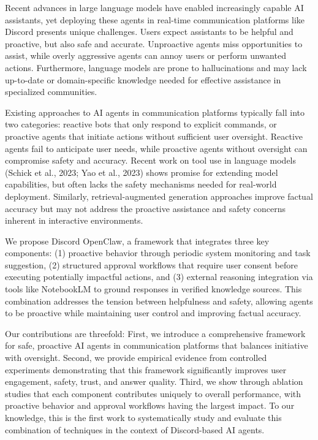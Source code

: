 Recent advances in large language models have enabled increasingly capable AI assistants, yet deploying these agents in real-time communication platforms like Discord presents unique challenges. Users expect assistants to be helpful and proactive, but also safe and accurate. Unproactive agents miss opportunities to assist, while overly aggressive agents can annoy users or perform unwanted actions. Furthermore, language models are prone to hallucinations and may lack up-to-date or domain-specific knowledge needed for effective assistance in specialized communities.

Existing approaches to AI agents in communication platforms typically fall into two categories: reactive bots that only respond to explicit commands, or proactive agents that initiate actions without sufficient user oversight. Reactive agents fail to anticipate user needs, while proactive agents without oversight can compromise safety and accuracy. Recent work on tool use in language models (Schick et al., 2023; Yao et al., 2023) shows promise for extending model capabilities, but often lacks the safety mechanisms needed for real-world deployment. Similarly, retrieval-augmented generation approaches improve factual accuracy but may not address the proactive assistance and safety concerns inherent in interactive environments.

We propose Discord OpenClaw, a framework that integrates three key components: (1) proactive behavior through periodic system monitoring and task suggestion, (2) structured approval workflows that require user consent before executing potentially impactful actions, and (3) external reasoning integration via tools like NotebookLM to ground responses in verified knowledge sources. This combination addresses the tension between helpfulness and safety, allowing agents to be proactive while maintaining user control and improving factual accuracy.

Our contributions are threefold: First, we introduce a comprehensive framework for safe, proactive AI agents in communication platforms that balances initiative with oversight. Second, we provide empirical evidence from controlled experiments demonstrating that this framework significantly improves user engagement, safety, trust, and answer quality. Third, we show through ablation studies that each component contributes uniquely to overall performance, with proactive behavior and approval workflows having the largest impact. To our knowledge, this is the first work to systematically study and evaluate this combination of techniques in the context of Discord-based AI agents.
